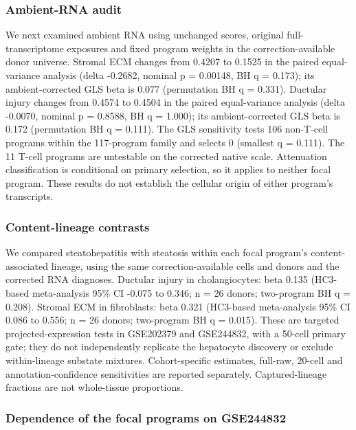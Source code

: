 \subsubsection{Ambient-RNA audit}\label{ambient-rna-audit}

We next examined ambient RNA using unchanged scores, original full-transcriptome exposures and fixed program weights in the correction-available donor universe. Stromal ECM changes from 0.4207 to 0.1525 in the paired equal-variance analysis (delta -0.2682, nominal p = 0.00148, BH q = 0.173); its ambient-corrected GLS beta is 0.077 (permutation BH q = 0.331). Ductular injury changes from 0.4574 to 0.4504 in the paired equal-variance analysis (delta -0.0070, nominal p = 0.8588, BH q = 1.000); its ambient-corrected GLS beta is 0.172 (permutation BH q = 0.111). The GLS sensitivity tests 106 non-T-cell programs within the 117-program family and selects 0 (smallest q = 0.111). The 11 T-cell programs are untestable on the corrected native scale. Attenuation classification is conditional on primary selection, so it applies to neither focal program. These results do not establish the cellular origin of either program's transcripts.

\subsubsection{Content-lineage contrasts}\label{content-lineage-contrasts}

We compared steatohepatitis with steatosis within each focal program's content-associated lineage, using the same correction-available cells and donors and the corrected RNA diagnoses. Ductular injury in cholangiocytes: beta 0.135 (HC3-based meta-analysis 95\% CI -0.075 to 0.346; n = 26 donors; two-program BH q = 0.208). Stromal ECM in fibroblasts: beta 0.321 (HC3-based meta-analysis 95\% CI 0.086 to 0.556; n = 26 donors; two-program BH q = 0.015). These are targeted projected-expression tests in GSE202379 and GSE244832, with a 50-cell primary gate; they do not independently replicate the hepatocyte discovery or exclude within-lineage substate mixtures. Cohort-specific estimates, full-raw, 20-cell and annotation-confidence sensitivities are reported separately. Captured-lineage fractions are not whole-tissue proportions.

\subsubsection{Dependence of the focal programs on GSE244832}\label{dependence-of-the-focal-programs-on-gse244832}

